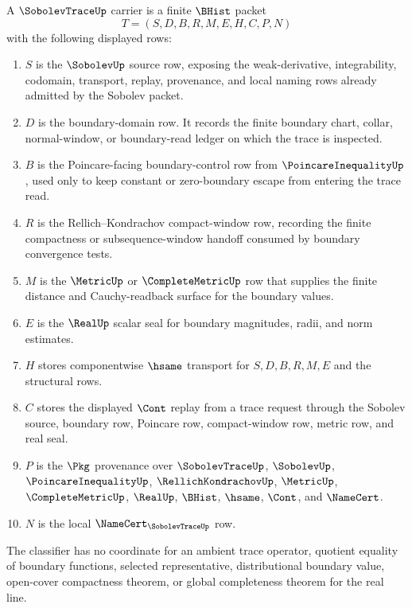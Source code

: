 \begin{definition}
\label{def:sobolev-trace-carrier}
A $\SobolevTraceUp$ carrier is a finite $\BHist$ packet
$$
T=(S,D,B,R,M,E,H,C,P,N)
$$
with the following displayed rows:
\begin{enumerate}
\item $S$ is the $\SobolevUp$ source row, exposing the weak-derivative, integrability, codomain, transport, replay, provenance, and local naming rows already admitted by the Sobolev packet.
\item $D$ is the boundary-domain row. It records the finite boundary chart, collar, normal-window, or boundary-read ledger on which the trace is inspected.
\item $B$ is the Poincare-facing boundary-control row from $\PoincareInequalityUp$, used only to keep constant or zero-boundary escape from entering the trace read.
\item $R$ is the Rellich--Kondrachov compact-window row, recording the finite compactness or subsequence-window handoff consumed by boundary convergence tests.
\item $M$ is the $\MetricUp$ or $\CompleteMetricUp$ row that supplies the finite distance and Cauchy-readback surface for the boundary values.
\item $E$ is the $\RealUp$ scalar seal for boundary magnitudes, radii, and norm estimates.
\item $H$ stores componentwise $\hsame$ transport for $S,D,B,R,M,E$ and the structural rows.
\item $C$ stores the displayed $\Cont$ replay from a trace request through the Sobolev source, boundary row, Poincare row, compact-window row, metric row, and real seal.
\item $P$ is the $\Pkg$ provenance over $\SobolevTraceUp$, $\SobolevUp$, $\PoincareInequalityUp$, $\RellichKondrachovUp$, $\MetricUp$, $\CompleteMetricUp$, $\RealUp$, $\BHist$, $\hsame$, $\Cont$, and $\NameCert$.
\item $N$ is the local $\NameCert_{\SobolevTraceUp}$ row.
\end{enumerate}
The classifier has no coordinate for an ambient trace operator, quotient equality of boundary functions, selected representative, distributional boundary value, open-cover compactness theorem, or global completeness theorem for the real line.
\end{definition}

